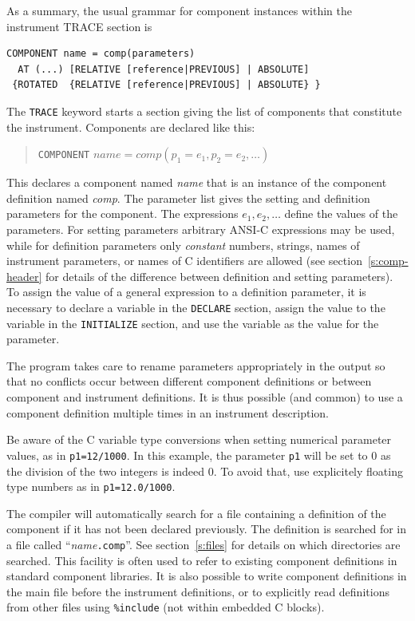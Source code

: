 As a summary, the usual grammar for component instances within the instrument TRACE section is
\begin{verbatim}
COMPONENT name = comp(parameters)
  AT (...) [RELATIVE [reference|PREVIOUS] | ABSOLUTE]
 {ROTATED  {RELATIVE [reference|PREVIOUS] | ABSOLUTE} }
\end{verbatim}

The \texttt{TRACE} keyword starts a section giving the list of
components that constitute the instrument.
Components are declared like this:
\begin{quote}
  \texttt{COMPONENT} $\textit{name} =
    \textit{comp}(p_1 = e_1, p_2 = e_2, \ldots)$
\end{quote}
 
This declares a component named \textit{name} that is an instance of the
component definition named \textit{comp}. The parameter list gives the
setting and definition parameters for the component. The expressions $e_1,
e_2, \ldots$ define the values of the parameters. For setting parameters
arbitrary ANSI-C expressions may be used, while for definition parameters
only \emph{constant} numbers, strings, names of instrument parameters, or names
of C identifiers are allowed (see section~\ref{s:comp-header} for details of
the difference between definition and setting parameters). To assign the
value of a general expression to a definition parameter, it is necessary to
declare a variable in the \texttt{DECLARE} section, assign the value to the
variable in the \texttt{INITIALIZE} section, and use the variable as the
value for the parameter.

The \MCX program takes care to rename parameters appropriately in the
output so that no conflicts occur between different component
definitions or between component and instrument definitions. It is thus
possible (and common) to use a component definition multiple times
in an instrument description.

Be aware of the C variable type conversions when setting numerical parameter values, as in \verb+p1=12/1000+. In this example, the parameter \verb+p1+ will be set to 0 as the division of
the two integers is indeed 0. To avoid that, use explicitely floating type numbers as in \verb+p1=12.0/1000+.

The \MCX compiler will automatically search for a file containing a
definition of the component if it has not been declared previously. The
definition is searched for in a file called ``\textit{name\/}\texttt{.comp}''. See
section~\ref{s:files} for details on which directories are searched. This
facility is often used to refer to existing component definitions in
standard component libraries. It is also possible to write component
definitions in the main file before the instrument definitions, or to
explicitly read definitions from other files using \verb+%include+
(not within embedded C blocks).

